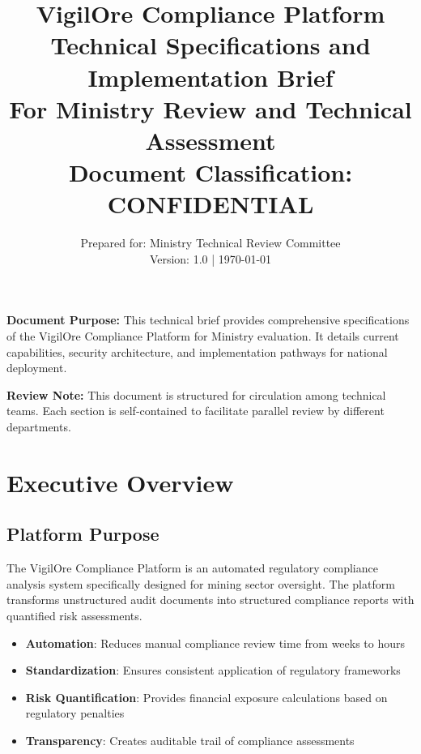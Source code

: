 \documentclass[11pt,a4paper]{article}
\title{
    \vspace{-2cm}
    \textcolor{govblue}{\textbf{VigilOre Compliance Platform}}\\
    \Large Technical Specifications and Implementation Brief\\
    \vspace{0.5cm}
    \large For Ministry Review and Technical Assessment\\
    \vspace{0.5cm}
    \normalsize Document Classification: \textbf{CONFIDENTIAL}
}
\author{
    Prepared for: Ministry Technical Review Committee\\
    Version: 1.0 | \today
}
\date{}
\begin{document}
\maketitle
\thispagestyle{empty}

\vspace{1cm}

\begin{tcolorbox}[colback=blue!5!white, colframe=govblue, sharp corners]
\textbf{Document Purpose:} This technical brief provides comprehensive specifications of the VigilOre Compliance Platform for Ministry evaluation. It details current capabilities, security architecture, and implementation pathways for national deployment.
\end{tcolorbox}

\vspace{0.5cm}

\begin{tcolorbox}[colback=yellow!10!white, colframe=warningyellow, sharp corners]
\textbf{Review Note:} This document is structured for circulation among technical teams. Each section is self-contained to facilitate parallel review by different departments.
\end{tcolorbox}

\newpage
\tableofcontents
\newpage

\section{Executive Overview}

\subsection{Platform Purpose}

The VigilOre Compliance Platform is an automated regulatory compliance analysis system specifically designed for mining sector oversight. The platform transforms unstructured audit documents into structured compliance reports with quantified risk assessments.

\begin{keypoint}
\begin{itemize}[leftmargin=*]
    \item \textbf{Automation}: Reduces manual compliance review time from weeks to hours
    \item \textbf{Standardization}: Ensures consistent application of regulatory frameworks
    \item \textbf{Risk Quantification}: Provides financial exposure calculations based on regulatory penalties
    \item \textbf{Transparency}: Creates auditable trail of compliance assessments
\end{itemize}
\end{keypoint}
\end{document}
